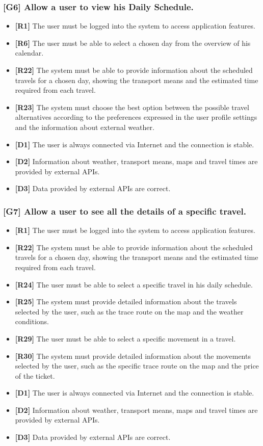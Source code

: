 \subsubsection{[G6] Allow a user to view his Daily Schedule.}
\begin{itemize}
	\item \textbf{[R1]} The user must be logged into the system to access application features.
	\item \textbf{[R6]} The user must be able to select a chosen day from the overview of his calendar.
	\item \textbf{[R22]} The system must be able to provide information about the scheduled travels for a chosen day, showing the transport means and the estimated time required from each travel.
	\item \textbf{[R23]} The system must choose the best option between the possible travel alternatives according to the preferences expressed in the user profile settings and the information about external weather.
	\item \textbf{[D1]} The user is always connected via Internet and the connection is stable.
	\item \textbf{[D2]} Information about weather, transport means, maps and travel times are provided by external APIs.
	\item \textbf{[D3]} Data provided by external APIs are correct.
\end{itemize}

\subsubsection{[G7] Allow a user to see all the details of a specific travel.}
\begin{itemize}
	\item \textbf{[R1]} The user must be logged into the system to access application features.
	\item \textbf{[R22]} The system must be able to provide information about the scheduled travels for a chosen day, showing the transport means and the estimated time required from each travel.
	\item \textbf{[R24]} The user must be able to select a specific travel in his daily schedule.
	\item \textbf{[R25]} The system must provide detailed information about the travels selected by the user, such as the trace route on the map and the weather conditions.
	\item \textbf{[R29]} The user must be able to select a specific movement in a travel.
	\item \textbf{[R30]} The system must provide detailed information about the movements selected by the user, such as the specific trace route on the map and the price of the ticket.
	\item \textbf{[D1]} The user is always connected via Internet and the connection is stable.
	\item \textbf{[D2]} Information about weather, transport means, maps and travel times are provided by external APIs.
	\item \textbf{[D3]} Data provided by external APIs are correct.
\end{itemize}

